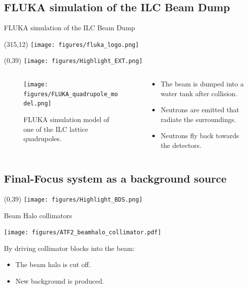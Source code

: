 \documentclass[xcolor={dvipsnames}]{beamer}
\newcommand{\flukalogo}{
  \setlength{\TPHorizModule}{1pt}
  \setlength{\TPVertModule}{1pt}
  \begin{textblock}{1}(315,12)
   \texttt{[image: figures/fluka\_logo.png]}
  \end{textblock}
}
\newcommand{\BDSsymbol}{
  \setlength{\TPHorizModule}{1pt}
  \setlength{\TPVertModule}{1pt}
  \begin{textblock}{1}(0,39)
   \texttt{[image: figures/Highlight\_BDS.png]}
  \end{textblock}
}
\newcommand{\EXTsymbol}{
  \setlength{\TPHorizModule}{1pt}
  \setlength{\TPVertModule}{1pt}
  \begin{textblock}{1}(0,39)
   \texttt{[image: figures/Highlight\_EXT.png]}
  \end{textblock}
}
\begin{document}
\subsection{FLUKA simulation of the ILC Beam Dump}
\begin{frame}{FLUKA simulation of the ILC Beam Dump}
\flukalogo
\EXTsymbol
\begin{columns}[T]
\begin{column}[b]{0.4\textwidth}
 \begin{figure}
 \centering
\texttt{[image: figures/FLUKA\_quadrupole\_model.png]}
\caption{\small FLUKA simulation model of one of the ILC lattice quadrupoles.}
\end{figure}
\end{column}
\begin{column}[b]{0.6\textwidth}
\begin{itemize}
 \item The beam is dumped into a water tank after collision.
 \item Neutrons are emitted that radiate the surroundings.
 \item Neutrons fly back towards the detectors.
\end{itemize}
\vspace*{0.5cm}
\end{column}
\end{columns}
\end{frame}

\subsection{Final-Focus system as a background source}
\BDSsymbol
\begin{frame}{Beam Halo collimators}
 \begin{center}
\texttt{[image: figures/ATF2\_beamhalo\_collimator.pdf]}
\end{center}
By driving collimator blocks into the beam:\\
\begin{itemize}
 \item The beam halo is cut off.
 \item New background is produced.
\end{itemize}

\end{frame}
\end{document}
